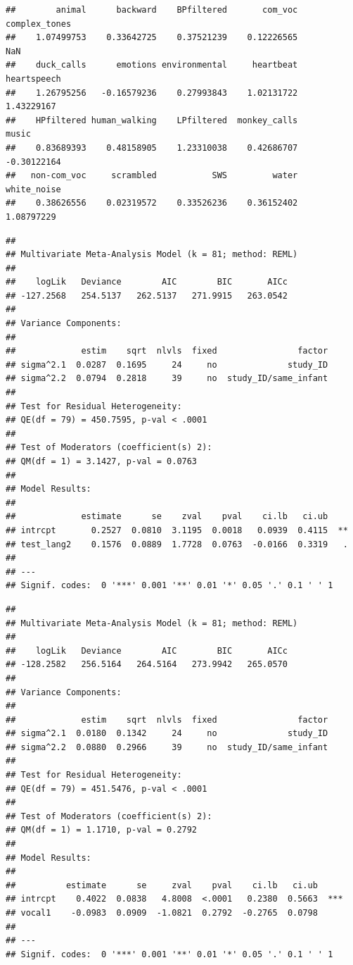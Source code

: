 \documentclass[man]{apa6}
\begin{document}
\begin{verbatim}
##        animal      backward    BPfiltered       com_voc complex_tones 
##    1.07499753    0.33642725    0.37521239    0.12226565           NaN 
##    duck_calls      emotions environmental     heartbeat   heartspeech 
##    1.26795256   -0.16579236    0.27993843    1.02131722    1.43229167 
##    HPfiltered human_walking    LPfiltered  monkey_calls         music 
##    0.83689393    0.48158905    1.23310038    0.42686707   -0.30122164 
##   non-com_voc     scrambled           SWS         water   white_noise 
##    0.38626556    0.02319572    0.33526236    0.36152402    1.08797229
\end{verbatim}

\begin{verbatim}
## 
## Multivariate Meta-Analysis Model (k = 81; method: REML)
## 
##    logLik   Deviance        AIC        BIC       AICc  
## -127.2568   254.5137   262.5137   271.9915   263.0542  
## 
## Variance Components: 
## 
##             estim    sqrt  nlvls  fixed                factor
## sigma^2.1  0.0287  0.1695     24     no              study_ID
## sigma^2.2  0.0794  0.2818     39     no  study_ID/same_infant
## 
## Test for Residual Heterogeneity: 
## QE(df = 79) = 450.7595, p-val < .0001
## 
## Test of Moderators (coefficient(s) 2): 
## QM(df = 1) = 3.1427, p-val = 0.0763
## 
## Model Results:
## 
##             estimate      se    zval    pval    ci.lb   ci.ub    
## intrcpt       0.2527  0.0810  3.1195  0.0018   0.0939  0.4115  **
## test_lang2    0.1576  0.0889  1.7728  0.0763  -0.0166  0.3319   .
## 
## ---
## Signif. codes:  0 '***' 0.001 '**' 0.01 '*' 0.05 '.' 0.1 ' ' 1
\end{verbatim}

\begin{verbatim}
## 
## Multivariate Meta-Analysis Model (k = 81; method: REML)
## 
##    logLik   Deviance        AIC        BIC       AICc  
## -128.2582   256.5164   264.5164   273.9942   265.0570  
## 
## Variance Components: 
## 
##             estim    sqrt  nlvls  fixed                factor
## sigma^2.1  0.0180  0.1342     24     no              study_ID
## sigma^2.2  0.0880  0.2966     39     no  study_ID/same_infant
## 
## Test for Residual Heterogeneity: 
## QE(df = 79) = 451.5476, p-val < .0001
## 
## Test of Moderators (coefficient(s) 2): 
## QM(df = 1) = 1.1710, p-val = 0.2792
## 
## Model Results:
## 
##          estimate      se     zval    pval    ci.lb   ci.ub     
## intrcpt    0.4022  0.0838   4.8008  <.0001   0.2380  0.5663  ***
## vocal1    -0.0983  0.0909  -1.0821  0.2792  -0.2765  0.0798     
## 
## ---
## Signif. codes:  0 '***' 0.001 '**' 0.01 '*' 0.05 '.' 0.1 ' ' 1
\end{verbatim}
\end{document}
